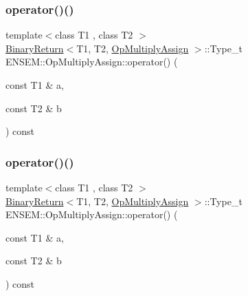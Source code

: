 \subsubsection{\texorpdfstring{operator()()}{operator()()}\hspace{0.1cm}{\footnotesize\ttfamily [1/3]}}
{\footnotesize\ttfamily template$<$class T1 , class T2 $>$ \\
\mbox{\hyperlink{structENSEM_1_1BinaryReturn}{Binary\+Return}}$<$T1, T2, \mbox{\hyperlink{structENSEM_1_1OpMultiplyAssign}{Op\+Multiply\+Assign}} $>$\+::Type\+\_\+t E\+N\+S\+E\+M\+::\+Op\+Multiply\+Assign\+::operator() (\begin{DoxyParamCaption}\item[{const T1 \&}]{a,  }\item[{const T2 \&}]{b }\end{DoxyParamCaption}) const\hspace{0.3cm}{\ttfamily [inline]}}

\mbox{\label{structENSEM_1_1OpMultiplyAssign_a066c102dbdd6eade3f255958de954a16}} 
\subsubsection{\texorpdfstring{operator()()}{operator()()}\hspace{0.1cm}{\footnotesize\ttfamily [2/3]}}
{\footnotesize\ttfamily template$<$class T1 , class T2 $>$ \\
\mbox{\hyperlink{structENSEM_1_1BinaryReturn}{Binary\+Return}}$<$T1, T2, \mbox{\hyperlink{structENSEM_1_1OpMultiplyAssign}{Op\+Multiply\+Assign}} $>$\+::Type\+\_\+t E\+N\+S\+E\+M\+::\+Op\+Multiply\+Assign\+::operator() (\begin{DoxyParamCaption}\item[{const T1 \&}]{a,  }\item[{const T2 \&}]{b }\end{DoxyParamCaption}) const\hspace{0.3cm}{\ttfamily [inline]}}

\mbox{\label{structENSEM_1_1OpMultiplyAssign_a066c102dbdd6eade3f255958de954a16}} 
